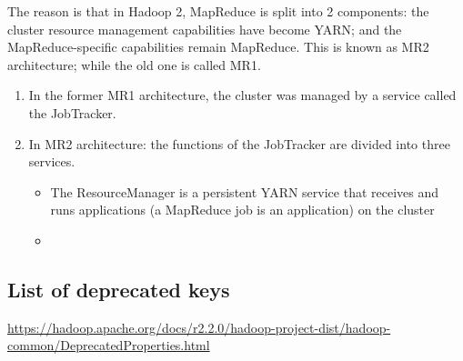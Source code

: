 The reason is that in Hadoop 2, MapReduce is split into 2
components: the cluster resource management capabilities have become YARN; and
the MapReduce-specific capabilities remain MapReduce. This is known as MR2
architecture; while the old one is called MR1.
\begin{enumerate}
  \item In the former MR1 architecture, the cluster was managed by a service
  called the JobTracker.
  
  \item In MR2 architecture: the functions of the JobTracker are divided into
  three services.
  \begin{itemize}
    \item The ResourceManager is a persistent YARN service that receives and
    runs applications (a MapReduce job is an application) on the cluster
    \item 
  \end{itemize}
\end{enumerate}

\subsection{List of deprecated keys}

\url{https://hadoop.apache.org/docs/r2.2.0/hadoop-project-dist/hadoop-common/DeprecatedProperties.html}

